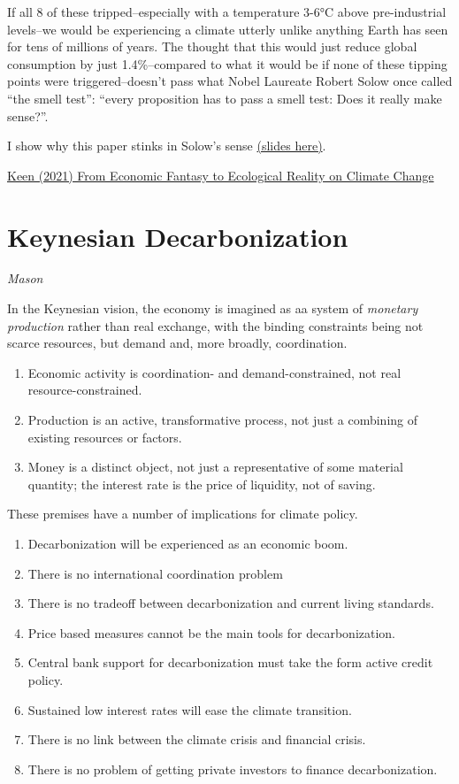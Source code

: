 \documentclass[
]{book}
\begin{document}
If all 8 of these tripped--especially with a temperature 3-6°C above pre-industrial levels--we would be experiencing a climate utterly unlike anything Earth has seen for tens of millions of years. The thought that this would just reduce global consumption by just 1.4\%--compared to what it would be if none of these tipping points were triggered--doesn't pass what Nobel Laureate Robert Solow once called ``the smell test'': ``every proposition has to pass a smell test: Does it really make sense?''.

I show why this paper stinks in Solow's sense \href{https://www.patreon.com/file?h=57752646\&i=9166994}{(slides here)}.

\href{https://www.patreon.com/posts/from-economic-to-57752646}{Keen (2021) From Economic Fantasy to Ecological Reality on Climate Change}

\hypertarget{keynesian-decarbonization}{%
\section{Keynesian Decarbonization}\label{keynesian-decarbonization}}

\emph{Mason}

In the Keynesian vision, the economy is imagined as aa system of \emph{monetary production} rather than real exchange, with the binding constraints being not scarce resources, but demand and, more broadly, coordination.

\begin{enumerate}
\def\labelenumi{\arabic{enumi}.}
\item
  Economic activity is coordination- and demand-constrained, not real resource-constrained.
\item
  Production is an active, transformative process, not just a combining of existing resources or factors.
\item
  Money is a distinct object, not just a representative of some material quantity; the interest rate is the price of liquidity, not of saving.
\end{enumerate}

These premises have a number of implications for climate policy.

\begin{enumerate}
\def\labelenumi{\arabic{enumi}.}
\item
  Decarbonization will be experienced as an economic boom.
\item
  There is no international coordination problem
\item
  There is no tradeoff between decarbonization and current living standards.
\item
  Price based measures cannot be the main tools for decarbonization.
\item
  Central bank support for decarbonization must take the form active credit policy.
\item
  Sustained low interest rates will ease the climate transition.
\item
  There is no link between the climate crisis and financial crisis.
\item
  There is no problem of getting private investors to finance decarbonization.
\end{enumerate}
\end{document}
